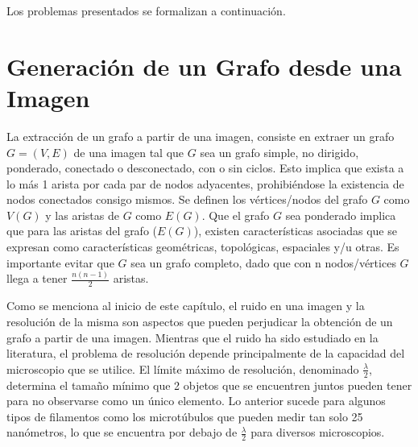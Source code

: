 Los problemas presentados se formalizan a continuaci\'on.


\section{Generaci\'on de un Grafo desde una Imagen}

La extracci\'on de un grafo a partir de una imagen, consiste en extraer un grafo $G = (V,E)$ de una imagen tal que $G$ sea un grafo simple, no dirigido, ponderado, conectado o desconectado, con o sin ciclos. Esto implica que exista a lo m\'as 1 arista por cada par de nodos adyacentes, prohibi\'endose la existencia de nodos conectados consigo mismos. Se definen los v\'ertices/nodos del grafo $G$ como $V(G)$ y las aristas de $G$ como $E(G)$. 
Que el grafo $G$ sea ponderado implica que para las aristas del grafo ($E(G)$), existen caracter\'isticas asociadas que se expresan como caracter\'isticas geom\'etricas, topol\'ogicas, espaciales y/u otras. Es importante evitar que $G$ sea un grafo completo, dado que con n nodos/v\'ertices $G$ llega a tener $\frac{n(n-1)}{2}$ aristas.

Como se menciona al inicio de este cap\'itulo, el ruido en una imagen y la resoluci\'on de la misma son aspectos que pueden perjudicar la obtenci\'on de un grafo a partir de una imagen. Mientras que el ruido ha sido estudiado en la literatura, el problema de resoluci\'on depende principalmente de la capacidad del microscopio que se utilice. El l\'imite m\'aximo de resoluci\'on, denominado $\frac{\lambda}{2}$, determina el tama\~no m\'inimo que 2 objetos que se encuentren juntos pueden tener para no observarse como un \'unico elemento. Lo anterior sucede para algunos tipos de filamentos como los microt\'ubulos que pueden medir tan solo 25 nan\'ometros, lo que se encuentra por debajo de $\frac{\lambda}{2}$ para diversos microscopios. 


